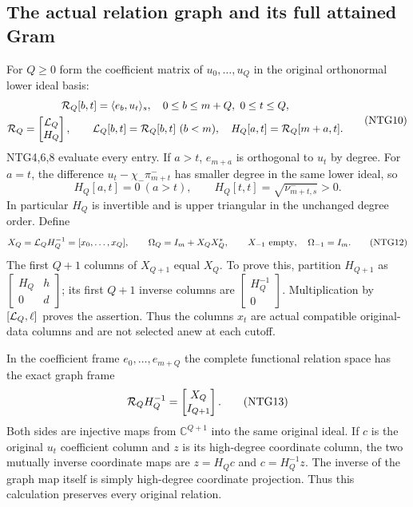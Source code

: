 \subsection{The actual relation graph and its full attained Gram}
For $Q\ge0$ form the coefficient matrix of $u_0,\ldots,u_Q$
in the original orthonormal lower ideal basis:
\[
\begin{gathered}
 {\cal R}_Q[b,t]=\langle e_b,u_t\rangle_s,\quad
       0\le b\le m+Q,\ 0\le t\le Q,\\
 {\cal R}_Q=\begin{bmatrix}{\cal L}_Q\\ H_Q\end{bmatrix},
 \qquad {\cal L}_Q[b,t]={\cal R}_Q[b,t]\ (b<m),\quad
 H_Q[a,t]={\cal R}_Q[m+a,t].
\end{gathered}                                                    \tag{NTG10}
\]
NTG4,6,8 evaluate every entry. If $a>t$, $e_{m+a}$ is
orthogonal to $u_t$ by degree. For $a=t$, the difference
$u_t-\chi_-\pi_{m+t}^-$ has smaller degree in the same
lower ideal, so
\[
 H_Q[a,t]=0\ (a>t),\qquad
 H_Q[t,t]=\sqrt{\nu_{m+t,s}^-}>0.
                                                               \tag{NTG11}
\]
In particular $H_Q$ is invertible and is upper triangular
in the unchanged degree order. Define
\[
 X_Q={\cal L}_QH_Q^{-1}=[x_0,\ldots,x_Q],\qquad
 \Omega_Q=I_m+X_QX_Q^*,\qquad
 X_{-1}\text{ empty},\quad\Omega_{-1}=I_m.
                                                               \tag{NTG12}
\]
The first $Q+1$ columns of $X_{Q+1}$ equal $X_Q$. To prove
this, partition $H_{Q+1}$ as
$\left[\begin{smallmatrix}H_Q&h\\0&d\end{smallmatrix}\right]$;
its first $Q+1$ inverse columns are
$\left[\begin{smallmatrix}H_Q^{-1}\\0\end{smallmatrix}\right]$.
Multiplication by $[{\cal L}_Q,\ell]$ proves the assertion.
Thus the columns $x_t$ are actual compatible original-data
columns and are not selected anew at each cutoff.

In the coefficient frame $e_0,\ldots,e_{m+Q}$ the complete
functional relation space has the exact graph frame
\[
 {\cal R}_QH_Q^{-1}
     =\begin{bmatrix}X_Q\\I_{Q+1}\end{bmatrix}.
                                                               \tag{NTG13}
\]
Both sides are injective maps from $\mathbb C^{Q+1}$ into
the same original ideal. If $c$ is the original $u_t$
coefficient column and $z$ is its high-degree coordinate
column, the two mutually inverse coordinate maps are
$z=H_Qc$ and $c=H_Q^{-1}z$. The inverse of the graph
map itself is simply high-degree coordinate projection.
Thus this calculation preserves every original relation.

